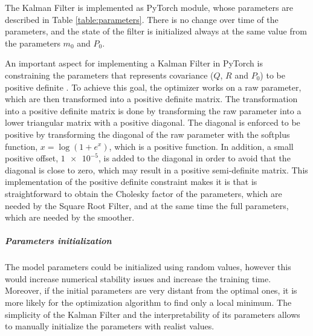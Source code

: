 \documentclass{article}
\begin{document}
The Kalman Filter is implemented as \textsf{PyTorch} module, whose parameters are described in Table \ref{table:parameters}.
There is no change over time of the parameters, and the state of the filter is initialized always at the same value from the parameters $m_0$ and $P_0$.


An important aspect for implementing a Kalman Filter in \textsf{PyTorch} is constraining the parameters that represents covariance ($Q$, $R$ and $P_0$) to be positive definite \cite{bishop_pattern_2006}. To achieve this goal, the optimizer works on a raw parameter, which are then transformed into a positive definite matrix.
The transformation into a positive definite matrix is done by transforming the raw parameter into a lower triangular matrix with a positive diagonal. The diagonal is enforced to be positive by transforming the diagonal of the raw parameter with the softplus function, $x = \log (1 + e^{x})$, which is a positive function. In addition, a small positive offset, $\num{1e-5}$, is added to the diagonal in order to avoid that the diagonal is close to zero, which may result in a positive semi-definite matrix. This implementation of the positive definite constraint makes it is that is straightforward to obtain the Cholesky factor of the parameters, which are needed by the Square Root Filter, and at the same time the full parameters, which are needed by the smoother.

\subparagraph{Parameters initialization}

The model parameters could be initialized using random values, however this would increase numerical stability issues and increase the training time. Moreover, if the initial parameters are very distant from the optimal ones, it is more likely for the optimization algorithm to find only a local minimum.  The simplicity of the Kalman Filter and the interpretability of its parameters allows to manually initialize the parameters with realist values.
\end{document}
